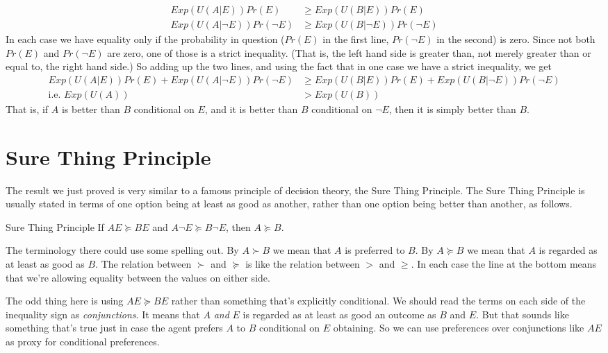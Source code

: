 \begin{align*}
Exp(U(A | E))Pr(E) &\geq Exp(U(B | E))Pr(E) \\
Exp(U(A |\neg  E))Pr(\neg E) &\geq Exp(U(B | \neg E))Pr(\neg E)
\end{align*}
In each case we have equality only if the probability in question ($Pr(E)$ in the first line, $Pr(\neg E)$ in the second) is zero. Since not both $Pr(E)$ and $Pr(\neg E)$ are zero, one of those is a strict inequality. (That is, the left hand side is greater than, not merely greater than or equal to, the right hand side.) So adding up the two lines, and using the fact that in one case we have a strict inequality, we get
\begin{align*}
Exp(U(A|E))Pr(E) + Exp(U(A |\neg  E))Pr(\neg E) &\geq Exp(U(B|E))Pr(E) + Exp(U(B | \neg E))Pr(\neg E) \\
\text{i.e. } Exp(U(A)) &> Exp(U(B))
\end{align*}
That is, if $A$ is better than $B$ conditional on $E$, and it is better than $B$ conditional on $\neg E$, then it is simply better than $B$.

\section{Sure Thing Principle}
The result we just proved is very similar to a famous principle of decision theory, the Sure Thing Principle. The Sure Thing Principle is usually stated in terms of one option being at least as good as another, rather than one option being better than another, as follows.

\begin{description*}
\item[Sure Thing Principle] If $AE \succeq BE$ and $A \neg E \succeq B \neg E$, then $A \succeq B$.
\end{description*}
The terminology there could use some spelling out. By $A \succ B$ we mean that $A$ is preferred to $B$. By $A \succeq B$ we mean that $A$ is regarded as at least as good as $B$. The relation between $\succ$ and $\succeq$ is like the relation between $>$ and $\geq$. In each case the line at the bottom means that we're allowing equality between the values on either side.

The odd thing here is using $AE \succeq BE$ rather than something that's explicitly conditional. We should read the terms on each side of the inequality sign as \textit{conjunctions}. It means that $A$ \textit{and} $E$ is regarded as at least as good an outcome as $B$ and $E$. But that sounds like something that's true just in case the agent prefers $A$ to $B$ conditional on $E$ obtaining. So we can use preferences over conjunctions like $AE$ as proxy for conditional preferences.

